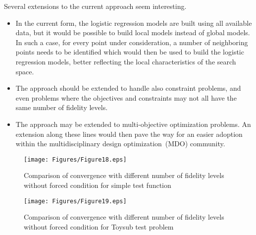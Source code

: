 Several extensions to the current approach seem interesting.
\begin{itemize}
	
	\item
	In the current form, the logistic regression models are built using all available data, but it would be possible to build local models instead of global models. In such a case, for every point under consideration, a number of neighboring points needs to be identified which would then be used to build the logistic regression models, better reflecting the local characteristics of the search space.
	\item
	The approach should be extended to handle also constraint problems, and even problems where the objectives and constraints may not all have the same number of fidelity levels. 
	\item
	The approach may be extended to multi-objective optimization problems. An extension along these lines would then pave the way for an easier adoption within the multidisciplinary design optimization~(MDO) community.
\end{itemize}

\begin{figure}[!htb]
\centering
\texttt{[image: Figures/Figure18.eps]}
\caption{Comparison of convergence with different number of fidelity levels without forced condition for simple test function}
\label{fig:testfidNotForcing}
\end{figure}

\begin{figure}[!htb]
\centering
\texttt{[image: Figures/Figure19.eps]}
\caption{Comparison of convergence with different number of fidelity levels without forced condition for Toysub test problem}
\label{fig:toysubfidNotForcing}
\end{figure}
